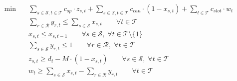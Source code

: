 \begin{align}
  \min\quad & \sum_{s \in \mathcal{S}, t \in \mathcal{T}} c_{op} \cdot z_{s,t} + \sum_{s \in \mathcal{S}, t \in \mathcal{T}} c_{can} \cdot (1 - x_{s,t}) + \sum_{t \in \mathcal{T}} c_{slot} \cdot w_{t} \tag{total\_cost} \\
  & \sum_{r \in \mathcal{R}} y_{r,t} \le \sum_{s \in \mathcal{S}} x_{s,t} \qquad \forall t \in \mathcal{T} \tag{fleet\_feasibility} \\
  & x_{s,t} \le x_{s,t-1} \qquad \forall s \in \mathcal{S},\; \forall t \in \mathcal{T} \setminus \{1\} \tag{service\_continuity} \\
  & \sum_{s \in \mathcal{S}} y_{r,t} \le 1 \qquad \forall r \in \mathcal{R},\; \forall t \in \mathcal{T} \tag{rolling\_stock\_assignment} \\
  & z_{s,t} \ge d_{t} - M \cdot (1 - x_{s,t}) \qquad \forall s \in \mathcal{S},\; \forall t \in \mathcal{T} \tag{delay\_constraint} \\
  & w_{t} \ge \sum_{s \in \mathcal{S}} x_{s,t} - \sum_{r \in \mathcal{R}} y_{r,t} \qquad \forall t \in \mathcal{T} \tag{additional\_slots\_constraint} \\
\end{align}